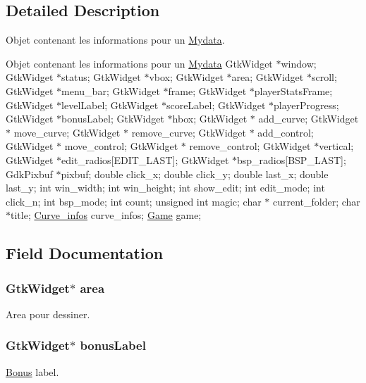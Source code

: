 \subsection{Detailed Description}
Objet contenant les informations pour un \hyperlink{struct_mydata}{Mydata}. 

Objet contenant les informations pour un \hyperlink{struct_mydata}{Mydata} Gtk\+Widget $\ast$window; Gtk\+Widget $\ast$status; Gtk\+Widget $\ast$vbox; Gtk\+Widget $\ast$area; Gtk\+Widget $\ast$scroll; Gtk\+Widget $\ast$menu\+\_\+bar; Gtk\+Widget $\ast$frame; Gtk\+Widget $\ast$player\+Stats\+Frame; Gtk\+Widget $\ast$level\+Label; Gtk\+Widget $\ast$score\+Label; Gtk\+Widget $\ast$player\+Progress; Gtk\+Widget $\ast$bonus\+Label; Gtk\+Widget $\ast$hbox; Gtk\+Widget $\ast$ add\+\_\+curve; Gtk\+Widget $\ast$ move\+\_\+curve; Gtk\+Widget $\ast$ remove\+\_\+curve; Gtk\+Widget $\ast$ add\+\_\+control; Gtk\+Widget $\ast$ move\+\_\+control; Gtk\+Widget $\ast$ remove\+\_\+control; Gtk\+Widget $\ast$vertical; Gtk\+Widget $\ast$edit\+\_\+radios\mbox{[}E\+D\+I\+T\+\_\+\+L\+A\+ST\mbox{]}; Gtk\+Widget $\ast$bsp\+\_\+radios\mbox{[}B\+S\+P\+\_\+\+L\+A\+ST\mbox{]}; Gdk\+Pixbuf $\ast$pixbuf; double click\+\_\+x; double click\+\_\+y; double last\+\_\+x; double last\+\_\+y; int win\+\_\+width; int win\+\_\+height; int show\+\_\+edit; int edit\+\_\+mode; int click\+\_\+n; int bsp\+\_\+mode; int count; unsigned int magic; char $\ast$ current\+\_\+folder; char $\ast$title; \hyperlink{struct_curve__infos}{Curve\+\_\+infos} curve\+\_\+infos; \hyperlink{struct_game}{Game} game; 

\subsection{Field Documentation}
\subsubsection[{\texorpdfstring{area}{area}}]{\setlength{\rightskip}{0pt plus 5cm}Gtk\+Widget$\ast$ area}\hypertarget{struct_mydata_a790d57ae229197048b24b1b0fdacc701}{}\label{struct_mydata_a790d57ae229197048b24b1b0fdacc701}
Area pour dessiner. 
\subsubsection[{\texorpdfstring{bonus\+Label}{bonusLabel}}]{\setlength{\rightskip}{0pt plus 5cm}Gtk\+Widget$\ast$ bonus\+Label}\hypertarget{struct_mydata_ab7e5d6396dfecd2bc73d0114bf4de49c}{}\label{struct_mydata_ab7e5d6396dfecd2bc73d0114bf4de49c}
\hyperlink{struct_bonus}{Bonus} label. 

